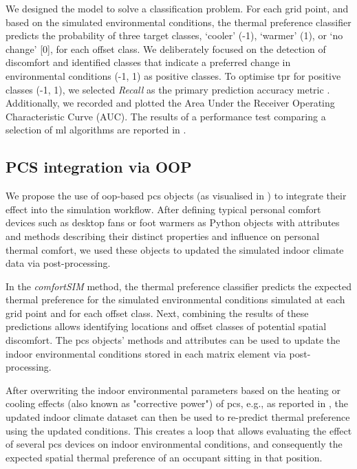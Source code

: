 We designed the model to solve a classification problem. For each grid point, and based on the simulated environmental conditions, the thermal preference classifier predicts the probability of three target classes, ‘cooler’ (-1), ‘warmer’ (1), or ‘no change’ [0], for each offset class. We deliberately focused on the detection of discomfort and identified classes that indicate a preferred change in environmental conditions (-1, 1) as positive classes. To optimise \gls{tpr} for positive classes (-1, 1), we selected \textit{Recall} as the primary prediction accuracy metric \citep{James2013}. Additionally, we recorded and plotted the Area Under the Receiver Operating Characteristic Curve (AUC). The results of a performance test comparing a selection of \gls{ml} algorithms are reported in .



\subsection{PCS integration via OOP}

We propose the use of \gls{oop}-based \gls{pcs} objects (as visualised in ) to integrate their effect into the simulation workflow. After defining typical personal comfort devices such as desktop fans or foot warmers as Python objects with attributes and methods describing their distinct properties and influence on personal thermal comfort, we used these objects to updated the simulated indoor climate data via post-processing.

In the \textit{comfortSIM} method, the thermal preference classifier predicts the expected thermal preference for the simulated environmental conditions simulated at each grid point and for each offset class. Next, combining the results of these predictions allows identifying locations and offset classes of potential spatial discomfort. The \gls{pcs} objects' methods and attributes can be used to update the indoor environmental conditions stored in each matrix element via post-processing.

After overwriting the indoor environmental parameters based on the heating or cooling effects (also known as "corrective power") of \gls{pcs}, e.g., as reported in \citep{ZhangHui2015}, the updated indoor climate dataset can then be used to re-predict thermal preference using the updated conditions. This creates a loop that allows evaluating the effect of several \gls{pcs} devices on indoor environmental conditions, and consequently the expected spatial thermal preference of an occupant sitting in that position.


